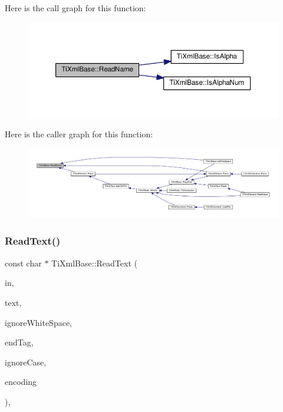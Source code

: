 Here is the call graph for this function\+:
\nopagebreak
\begin{figure}[H]
\begin{center}
\leavevmode
\includegraphics[width=350pt]{class_ti_xml_base_a1c21a6ab5f7b503acd91f35f183734b3_cgraph}
\end{center}
\end{figure}
Here is the caller graph for this function\+:
\nopagebreak
\begin{figure}[H]
\begin{center}
\leavevmode
\includegraphics[width=350pt]{class_ti_xml_base_a1c21a6ab5f7b503acd91f35f183734b3_icgraph}
\end{center}
\end{figure}
\mbox{\label{class_ti_xml_base_aa646c74921aa33156968b802bbf5566e}} 
\subsubsection{\texorpdfstring{Read\+Text()}{ReadText()}}
{\footnotesize\ttfamily const char $\ast$ Ti\+Xml\+Base\+::\+Read\+Text (\begin{DoxyParamCaption}\item[{const char $\ast$}]{in,  }\item[{\hyperlink{tinyxml_8h_a92bada05fd84d9a0c9a5bbe53de26887}{T\+I\+X\+M\+L\+\_\+\+S\+T\+R\+I\+NG} $\ast$}]{text,  }\item[{bool}]{ignore\+White\+Space,  }\item[{const char $\ast$}]{end\+Tag,  }\item[{bool}]{ignore\+Case,  }\item[{\hyperlink{tinyxml_8h_a88d51847a13ee0f4b4d320d03d2c4d96}{Ti\+Xml\+Encoding}}]{encoding }\end{DoxyParamCaption})\hspace{0.3cm}{\ttfamily [static]}, {\ttfamily [protected]}}

